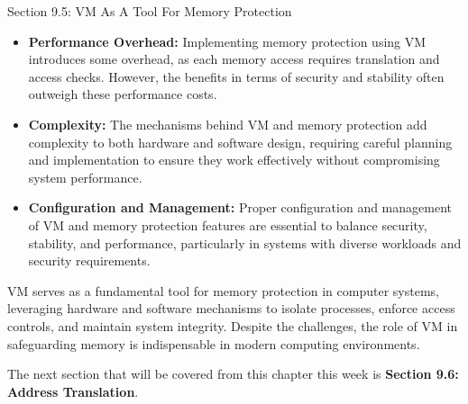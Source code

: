 \begin{notes}{Section 9.5: VM As A Tool For Memory Protection}
    \begin{itemize}
        \item \textbf{Performance Overhead:} Implementing memory protection using VM introduces some overhead, as each memory access requires translation and access checks. However, the benefits in 
        terms of security and stability often outweigh these performance costs.
        \item \textbf{Complexity:} The mechanisms behind VM and memory protection add complexity to both hardware and software design, requiring careful planning and implementation to ensure they 
        work effectively without compromising system performance.
        \item \textbf{Configuration and Management:} Proper configuration and management of VM and memory protection features are essential to balance security, stability, and performance, particularly 
        in systems with diverse workloads and security requirements.
    \end{itemize}
    
    VM serves as a fundamental tool for memory protection in computer systems, leveraging hardware and software mechanisms to isolate processes, enforce access controls, and maintain system integrity. 
    Despite the challenges, the role of VM in safeguarding memory is indispensable in modern computing environments.
\end{notes}

The next section that will be covered from this chapter this week is \textbf{Section 9.6: Address Translation}.

